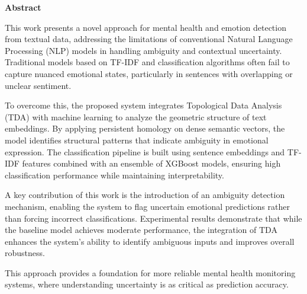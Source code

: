 \begin{flushleft}
    {\Huge\bfseries Abstract}
\end{flushleft}

\vspace{1.5cm}

This work presents a novel approach for mental health and emotion detection from textual
data, addressing the limitations of conventional Natural Language Processing (NLP) models in
handling ambiguity and contextual uncertainty. Traditional models based on TF-IDF and
classification algorithms often fail to capture nuanced emotional states, particularly in
sentences with overlapping or unclear sentiment.

To overcome this, the proposed system integrates Topological Data Analysis (TDA) with machine learning to analyze the geometric structure of text embeddings. By applying persistent homology on dense semantic vectors, the model identifies structural patterns that indicate ambiguity in emotional expression. The classification pipeline is built using sentence embeddings and TF-IDF features combined with an ensemble of XGBoost models, ensuring high classification performance while maintaining interpretability.

A key contribution of this work is the introduction of an ambiguity detection mechanism,
enabling the system to flag uncertain emotional predictions rather than forcing incorrect
classifications. Experimental results demonstrate that while the baseline model achieves
moderate performance, the integration of TDA enhances the system's ability to identify
ambiguous inputs and improves overall robustness.

This approach provides a foundation for more reliable mental health monitoring systems, where
understanding uncertainty is as critical as prediction accuracy.
